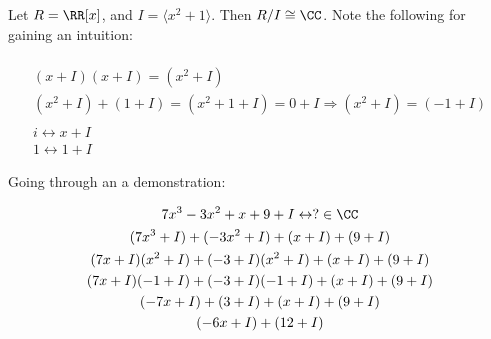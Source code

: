 \documentclass[class=scrartcl, crop=false]{standalone}
\begin{document}
\begin{example}
  Let $R = \RR[x]$, and $I = \langle x^2 + 1 \rangle $. Then $R / I \cong \CC$. Note the following for gaining an intuition:
  \\\\
  \begin{gather*}
    (x + I)(x + I) = (x^2 + I) \\
    (x^2 + I) + (1 + I) = (x^2 + 1 + I) = 0 + I \Rightarrow (x^2 + I) = (-1 + I)
    \\\\
    i \leftrightarrow x + I \\
    1 \leftrightarrow 1 + I
  \end{gather*} 

  Going through an a demonstration:

  \begin{gather*}
    7x^3 - 3x^2 + x + 9 + I \leftrightarrow ? \in \CC \\
    (7x^3 + I) + (-3x^2 + I) + (x + I) + (9 + I) \\
    (7x + I)(x^2 + I) + (-3 + I)(x^2 + I) + (x + I) + (9 + I) \\
    (7x + I)(-1 + I) + (-3 + I)(-1 + I) + (x + I) + (9 + I) \\
    (-7x + I) + (3 + I) + (x + I) + (9 + I) \\
    (-6x + I) + (12 + I) 
  \end{gather*} 

\end{example} 
\end{document}
